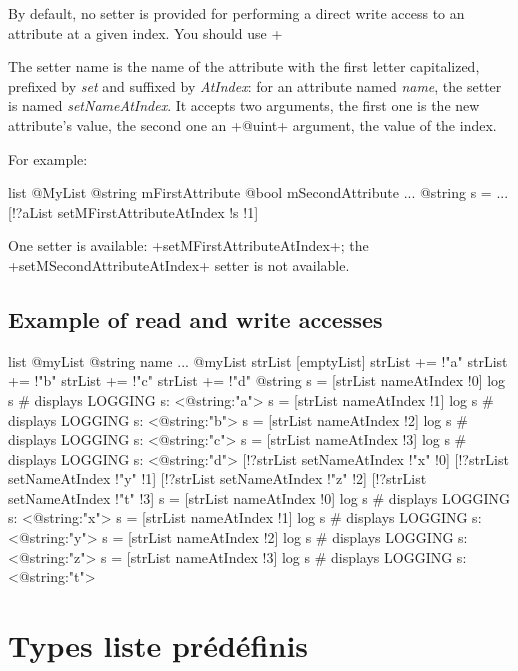 By default, no setter is provided for performing a direct write access to an attribute at a given index. You should use \ggs+%

The setter name is the name of the attribute with the first letter capitalized, prefixed by \emph{set} and suffixed by \emph{AtIndex}: for an attribute named \emph{name}, the setter is named \emph{setNameAtIndex}. It accepts two arguments, the first one is the new attribute's value, the second one an \ggs+@uint+ argument, the value of the index.

For example:

\begin{galgas}
list @MyList {
  @string mFirstAttribute %
  @bool mSecondAttribute
}
...
@string s = ...
[!?aList setMFirstAttributeAtIndex !s !1]
\end{galgas}

One setter is available: \ggs+setMFirstAttributeAtIndex+; the \ggs+setMSecondAttributeAtIndex+ setter is not available.

\subsection{Example of read and write accesses}

\begin{galgas}
list @myList {
  @string name
}
...
@myList strList [emptyList]
strList += !"a"
strList += !"b"
strList += !"c"
strList += !"d"
@string s = [strList nameAtIndex !0]
log s # displays LOGGING s: <@string:"a">
s = [strList nameAtIndex !1]
log s # displays LOGGING s: <@string:"b">
s = [strList nameAtIndex !2]
log s # displays LOGGING s: <@string:"c">
s = [strList nameAtIndex !3]
log s # displays LOGGING s: <@string:"d">
[!?strList setNameAtIndex !"x" !0]
[!?strList setNameAtIndex !"y" !1]
[!?strList setNameAtIndex !"z" !2]
[!?strList setNameAtIndex !"t" !3]
s = [strList nameAtIndex !0]
log s # displays LOGGING s: <@string:"x">
s = [strList nameAtIndex !1]
log s # displays LOGGING s: <@string:"y">
s = [strList nameAtIndex !2]
log s # displays LOGGING s: <@string:"z">
s = [strList nameAtIndex !3]
log s # displays LOGGING s: <@string:"t">
\end{galgas}


\section{Types liste prédéfinis}


